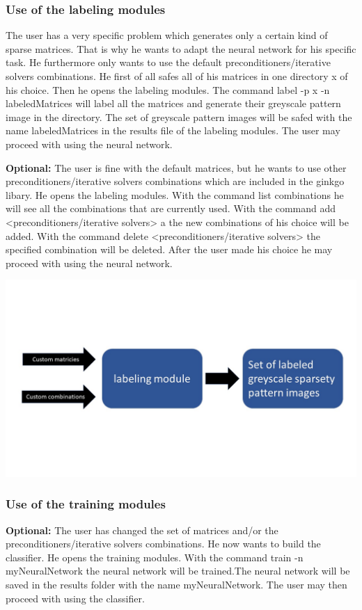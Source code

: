 \documentclass[parskip=full]{scrartcl}
\begin{document}
\subsubsection{Use of the \glspl{labeling module}}
The user has a very specific problem which generates only a certain kind of sparse matrices. That is why he wants to adapt the neural network for his specific task. He furthermore only wants to use the default \glspl{preconditioner}/\glspl{iterative solver} combinations. He first of all safes all of his matrices in one directory x of his choice. Then he opens the \glspl{labeling module}. The command label -p x -n labeledMatrices will label all the matrices and generate their greyscale pattern image in the directory. The set of greyscale pattern images will be safed with the name labeledMatrices in the results file of the \glspl{labeling module}. The user may proceed with using the neural network.


\textbf{Optional:} The user is fine with the default matrices, but he wants to use other \glspl{preconditioner}/\glspl{iterative solver} combinations which are included in the ginkgo libary. He opens the \glspl{labeling module}. With the command list combinations he will see all the combinations that are currently used. With the command add <\glspl{preconditioner}/\glspl{iterative solver}> a the new combinations of his choice will be added. With the command delete <\glspl{preconditioner}/\glspl{iterative solver}> the specified combination will be deleted. After the user made his choice he may proceed with using the neural network.
\begin{center}
\includegraphics[width=\textwidth]{labelingModule}
\end{center}


\subsubsection{Use of the \glspl{training module}}
\textbf{Optional:} The user has changed the set of matrices and/or the \glspl{preconditioner}/\glspl{iterative solver} combinations. He now wants to build the classifier. He opens the \glspl{training module}. With the command train -n myNeuralNetwork the neural network will be trained.The neural network will be saved in the results folder with the name myNeuralNetwork.  The user may then proceed with using the classifier.
\end{document}
